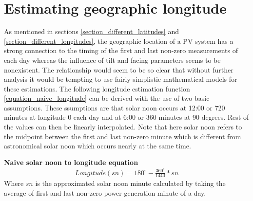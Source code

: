 
\newpage
\section{Estimating geographic longitude}
\noindent As mentioned in sections \ref{section_different_latitudes} and \ref{section_different_longitudes}, the geographic location of a PV system has a strong connection to the timing of the first and last non-zero measurements of each day whereas the influence of tilt and facing parameters seems to be nonexistent. The relationship would seem to be so clear that without further analysis it would be tempting to use fairly simplistic mathematical models for these estimations. The following longitude estimation function \ref{equation_naive_longitude} can be derived with the use of two basic assumptions. These ssumptions are that solar noon occurs at 12:00 or 720 minutes at longitude 0 each day and at 6:00 or 360 minutes at 90 degrees. Rest of the values can then be linearly interpolated. Note that here solar noon refers to the midpoint between the first and last non-zero minute which is different from astronomical solar noon which occurs nearly at the same time.

\hfill \break






\noindent\textbf{Naive solar noon to longitude equation}
%
\begin{equation}
\begin{split}
\label{equation_naive_longitude}
Longitude(sn)=180^\circ-\frac{360^\circ}{1440}*sn
\end{split}
\end{equation}
Where $sn$ is the approximated solar noon minute calculated by taking the average of first and last non-zero power generation minute of a day. %

